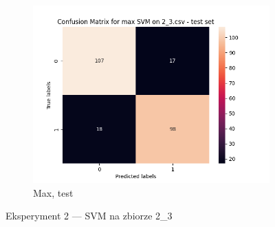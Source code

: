 \documentclass[12pt]{article}
\newcommand*{\subfigwidth}{0.24\textwidth}
\begin{document}
\begin{figure}[H]
\begin{subfigure}[t]{\subfigwidth}
        \includegraphics[width=\linewidth]{img/exp_2/svm/2_3/max/test_matrix.png}
        \caption{Max, test}
    \end{subfigure} 
    
    \caption{Eksperyment 2 --- SVM na zbiorze 2\_3}
\end{figure}

\clearpage
\end{document}
